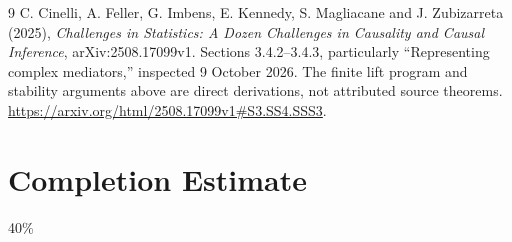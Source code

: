 \documentclass[11pt]{article}
\theoremstyle{remark}
\begin{document}
\begin{thebibliography}{9}
 C. Cinelli, A. Feller, G. Imbens, E. Kennedy, S. Magliacane and J. Zubizarreta (2025), \emph{Challenges in Statistics: A Dozen Challenges in Causality and Causal Inference}, arXiv:2508.17099v1. Sections 3.4.2--3.4.3, particularly ``Representing complex mediators,'' inspected 9 October 2026. The finite lift program and stability arguments above are direct derivations, not attributed source theorems. \url{https://arxiv.org/html/2508.17099v1#S3.SS4.SSS3}.
\end{thebibliography}

\section{Completion Estimate}
40\%
\end{document}
